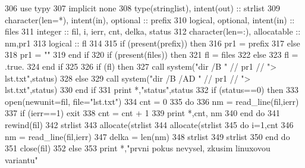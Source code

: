\begin{DoxyCode}
306         \textcolor{keywordtype}{use }typy
307         \textcolor{keywordtype}{implicit none}
308         \textcolor{keywordtype}{type}(stringlist), \textcolor{keywordtype}{intent(out)} :: strlist
309         \textcolor{keywordtype}{character(len=*)}, \textcolor{keywordtype}{intent(in)}, \textcolor{keywordtype}{optional} :: prefix
310         \textcolor{keywordtype}{logical}, \textcolor{keywordtype}{optional}, \textcolor{keywordtype}{intent(in)} :: files
311         \textcolor{keywordtype}{integer} :: fil, i, ierr, cnt, delka, status
312         \textcolor{keywordtype}{character(len=:)}, \textcolor{keywordtype}{allocatable} :: nm,pr1
313         \textcolor{keywordtype}{logical} :: fl
314 
315         \textcolor{keywordflow}{if} (\textcolor{keyword}{present}(prefix)) then
316         pr1 = prefix
317         else
318             pr1 = \textcolor{stringliteral}{""}
319 \textcolor{keyword}{        end }if
320         \textcolor{keywordflow}{if} (\textcolor{keyword}{present}(files)) then
321         fl = files
322         else
323             fl = .true.
324 \textcolor{keyword}{        end }if
325 
326         \textcolor{keywordflow}{if} (fl) then
327         \textcolor{keyword}{call }system(\textcolor{stringliteral}{"dir /B "} // pr1 // \textcolor{stringliteral}{"> lst.txt"},status)
328         else
329             \textcolor{keyword}{call }system(\textcolor{stringliteral}{"dir /B /AD "} // pr1 // \textcolor{stringliteral}{"> lst.txt"},status)
330 \textcolor{keyword}{        end }if
331         print *,\textcolor{stringliteral}{"status"},status
332         \textcolor{keywordflow}{if} (status==0) then
333             \textcolor{keyword}{open}(newunit=fil, file=\textcolor{stringliteral}{"lst.txt"})
334             cnt = 0
335             do
336                 nm = read_line(fil,ierr)
337                 \textcolor{keywordflow}{if} (ierr==1) exit
338                 cnt = cnt + 1
339                 print *,cnt, nm
340 \textcolor{keyword}{            end }do
341             rewind(fil)
342             strlist%
343             \textcolor{keyword}{allocate}(strlist%
344             \textcolor{keyword}{allocate}(strlist%
345             \textcolor{keywordflow}{do} i=1,cnt
346                 nm = read_line(fil,ierr)
347                 delka = len(nm)
348                 strlist%
349                 strlist%
350 \textcolor{keyword}{            end }do
351         \textcolor{keyword}{close}(fil)
352         else
353             print *,\textcolor{stringliteral}{"prvni pokus nevysel, zkusim linuxovou variantu"}

\end{DoxyCode}
